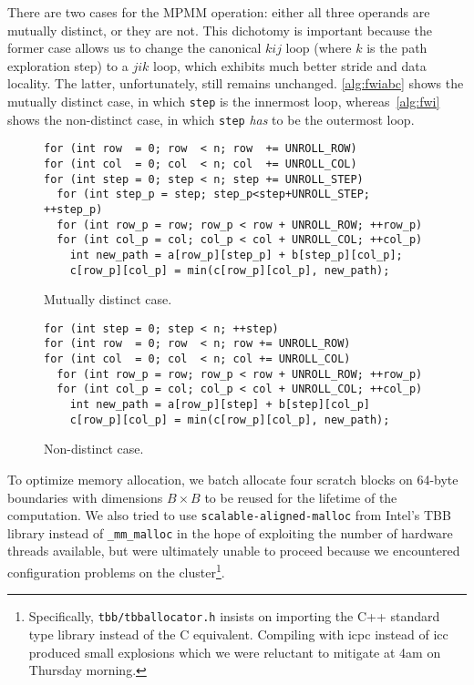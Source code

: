 \documentclass{scrartcl}
\begin{document}
  There are two cases for the MPMM operation: either all three operands are mutually distinct, or they are not. This dichotomy is important because the former case allows us to change the canonical $kij$ loop (where $k$ is the path exploration step) to a $jik$ loop, which exhibits much better stride and data locality. The latter, unfortunately, still remains unchanged. \autoref{alg:fwiabc} shows the mutually distinct case, in which \texttt{step} is the innermost loop, whereas~\autoref{alg:fwi} shows the non-distinct case, in which \texttt{step} \emph{has} to be the outermost loop.

  \begin{figure}[ht!]
    \begin{lstlisting}
for (int row  = 0; row  < n; row  += UNROLL_ROW)
for (int col  = 0; col  < n; col  += UNROLL_COL)
for (int step = 0; step < n; step += UNROLL_STEP)
  for (int step_p = step; step_p<step+UNROLL_STEP; ++step_p)
  for (int row_p = row; row_p < row + UNROLL_ROW; ++row_p)
  for (int col_p = col; col_p < col + UNROLL_COL; ++col_p)
    int new_path = a[row_p][step_p] + b[step_p][col_p];
    c[row_p][col_p] = min(c[row_p][col_p], new_path);
    \end{lstlisting}
    \caption{Mutually distinct case.\label{alg:fwiabc}}
  \end{figure}

  \begin{figure}[ht!]
    \begin{lstlisting}
for (int step = 0; step < n; ++step)
for (int row  = 0; row  < n; row += UNROLL_ROW)
for (int col  = 0; col  < n; col += UNROLL_COL)
  for (int row_p = row; row_p < row + UNROLL_ROW; ++row_p)
  for (int col_p = col; col_p < col + UNROLL_COL; ++col_p)
    int new_path = a[row_p][step] + b[step][col_p]
    c[row_p][col_p] = min(c[row_p][col_p], new_path);
    \end{lstlisting}
    \caption{Non-distinct case.\label{alg:fwi}}
  \end{figure}

  To optimize memory allocation, we batch allocate four scratch blocks on 64-byte boundaries with dimensions $B \times B$ to be reused for the lifetime of the computation. We also tried to use \texttt{scalable-aligned-malloc} from Intel's TBB library instead of \texttt{\_mm\_malloc} in the hope of exploiting the number of hardware threads available, but were ultimately unable to proceed because we encountered configuration problems on the cluster\footnote{Specifically, \texttt{tbb/tbballocator.h} insists on importing the C++ standard type library instead of the C equivalent. Compiling with icpc instead of icc produced small explosions which we were reluctant to mitigate at 4am on Thursday morning.}.
\end{document}
